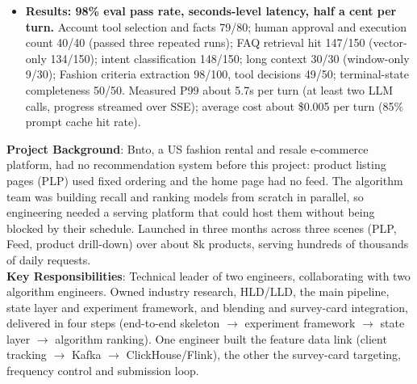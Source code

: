 \documentclass{resume}
\begin{document}
\begin{itemize}
    \item \textbf{Results: 98\% eval pass rate, seconds-level latency, half a cent per turn.} Account tool selection and facts 79/80; human approval and execution count 40/40 (passed three repeated runs); FAQ retrieval hit 147/150 (vector-only 134/150); intent classification 148/150; long context 30/30 (window-only 9/30); Fashion criteria extraction 98/100, tool decisions 49/50; terminal-state completeness 50/50. Measured P99 about 5.7s per turn (at least two LLM calls, progress streamed over SSE); average cost about \$0.005 per turn (85\% prompt cache hit rate).
\end{itemize}


\textbf{Project Background}: Bnto, a US fashion rental and resale e-commerce platform, had no recommendation system before this project: product listing pages (PLP) used fixed ordering and the home page had no feed. The algorithm team was building recall and ranking models from scratch in parallel, so engineering needed a serving platform that could host them without being blocked by their schedule. Launched in three months across three scenes (PLP, Feed, product drill-down) over about 8k products, serving hundreds of thousands of daily requests.\\

\textbf{Key Responsibilities}: Technical leader of two engineers, collaborating with two algorithm engineers. Owned industry research, HLD/LLD, the main pipeline, state layer and experiment framework, and blending and survey-card integration, delivered in four steps (end-to-end skeleton $\rightarrow$ experiment framework $\rightarrow$ state layer $\rightarrow$ algorithm ranking). One engineer built the feature data link (client tracking $\rightarrow$ Kafka $\rightarrow$ ClickHouse/Flink), the other the survey-card targeting, frequency control and submission loop.\\
\end{document}
